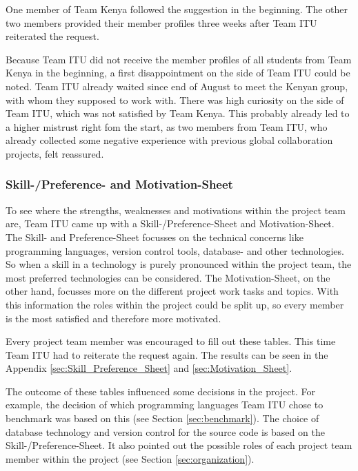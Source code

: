 One member of Team Kenya followed the suggestion in the beginning. The other two members provided their member profiles three weeks after Team ITU reiterated the request.

Because Team ITU did not receive the member profiles of all students from Team Kenya in the beginning, a first disappointment on the side of Team ITU could be noted. Team ITU already waited since end of August to meet the Kenyan group, with whom they supposed to work with. There was high curiosity on the side of Team ITU, which was not satisfied by Team Kenya. This probably already led to a higher mistrust right fom the start, as two members from Team ITU, who already collected some negative experience with previous global collaboration projects, felt reassured.


\subsubsection {Skill-/Preference- and Motivation-Sheet}
\label{sec:skill_sheet}
To see where the strengths, weaknesses and motivations within the project team are, Team ITU came up with a Skill-/Preference-Sheet and Motivation-Sheet. The Skill- and Preference-Sheet focusses on the technical concerns like programming languages, version control tools, database- and other technologies. So when a skill in a technology is purely pronounced within the project team, the most preferred technologies can be considered. The Motivation-Sheet, on the other hand, focusses more on the different project work tasks and topics. With this information the roles within the project could be split up, so every member is the most satisfied and therefore more motivated.

Every project team member was encouraged to fill out these tables. This time Team ITU had to reiterate the request again. The results can be seen in the Appendix \ref{sec:Skill_Preference_Sheet} and \ref{sec:Motivation_Sheet}.

The outcome of these tables influenced some decisions in the project. For example, the decision of which programming languages Team ITU chose to benchmark was based on this (see Section \ref{sec:benchmark}). The choice of database technology and version control for the source code is based on the Skill-/Preference-Sheet. It also pointed out the possible roles of each project team member within the project (see Section \ref{sec:organization}).

